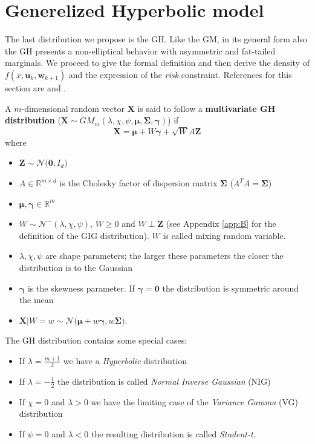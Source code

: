 \section{Generelized Hyperbolic model}
The last distribution we propose is the \gls{GH}. Like the \gls{GM}, in its general form also the \gls{GH} presents a non-elliptical behavior with asymmetric and fat-tailed marginals. We proceed to give the formal definition and then derive the density of $f(x,\bm{u}_k,\bm{w}_{k+1})$
and the expression of the \textit{risk} constraint. References for this section are \cite{Brey2013} and \cite{McNeil2005}.
\begin{definition}[GH distribution]\label{def:GH}
	A $m$-dimensional random vector $\bm{X}$ is said to follow a \textbf{multivariate GH distribution} ($\bm{X} \sim GM_m(\lambda,\chi,\psi,\bm{\mu},\bm{\Sigma},\bm{\gamma})$) if \[ \bm{X} = \bm{\mu}+W\bm{\gamma}+\sqrt{W}A\bm{Z} \] where 
	\begin{itemize}
		\item $\bm{Z} \sim \mathcal{N}\big(\bm{0},I_d\big)$
		\item $A \in \mathbb{R}^{m \times d} $ is the Cholesky factor of dispersion matrix $\bm{\Sigma}$ ($A^TA = \bm{\Sigma}$)
		\item $\bm{\mu}, \bm{\gamma} \in \mathbb{R}^m$
		\item $W \sim \mathcal{N}^-(\lambda,\chi,\psi)$, $W \geq 0$ and $W \perp \bm{Z}$ (see Appendix \ref{app:B} for the definition of the \gls{GIG} distribution). $W$ is called mixing random variable.
	\end{itemize}
\end{definition}
\begin{remark}
	\begin{itemize}
		\item $\lambda,\chi,\psi$ are shape parameters; the larger these parameters the closer the distribution is to the Gaussian
		\item $\bm{\gamma}$ is the skewness parameter. If $\bm{\gamma}= \bm{0}$ the distribution is symmetric around the mean
		\item $\bm{X}\lvert W = w \sim \mathcal{N}\big(\bm{\mu}+w\bm{\gamma},w\bm{\Sigma}\big)$.
	\end{itemize}
\end{remark}
The GH distribution contains some special cases:
\begin{itemize}
	\item If $\lambda=\frac{m+1}{2}$ we have a \textit{Hyperbolic} distribution
	\item If $\lambda=-\frac{1}{2}$ the distribution is called \textit{Normal Inverse Gaussian} (NIG)
	\item If $\chi = 0$ and $\lambda > 0$ we have the limiting case of the \textit{Variance Gamma} (VG) distribution
	\item If $\psi = 0$ and $\lambda < 0$ the resulting distribution is called \textit{Student-t}.
\end{itemize}
	
